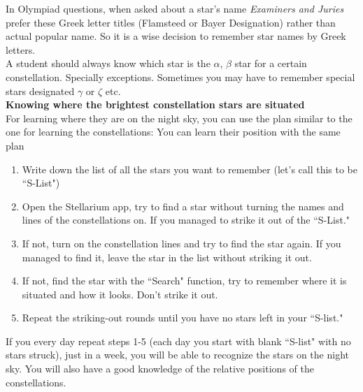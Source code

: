 \documentclass[a4paper,12pt]{extarticle}
\begin{document}
In Olympiad questions, when asked about a star’s name \textit{Examiners and Juries} prefer these Greek letter titles (Flamsteed or Bayer Designation) rather than actual popular name. So it is a wise decision to remember star names by Greek letters.\\

A student should always know which star is the $\alpha$, $\beta$ star for a certain constellation. Specially exceptions. Sometimes you may have to remember special stars designated $\gamma$ or $\zeta$ etc.\\

\textbf{Knowing where the brightest constellation stars are situated}\\

For learning where they are on the night sky, you can use the plan similar to the one for learning the constellations:
You can learn their position with the same plan

\begin{enumerate}[1.]
	\item  Write down the list of all the stars you want to remember (let's call this to be ``S-List")
	\item Open the Stellarium app, try to find a star without turning the names and lines of the constellations on. If you managed to strike it out of the ``S-List."
	\item If not, turn on the constellation lines and try to find the star again. If you managed to find it, leave the star in the list without striking it out.
	\item If not, find the star with the ``Search" function, try to remember where it is situated and how it looks. Don't strike it out.
	\item  Repeat the striking-out rounds until you have no stars left in your ``S-list."
\end{enumerate}

If you every day repeat steps 1-5 (each day you start with blank ``S-list" with no stars struck), just in a week, you will be able to recognize the stars on the night sky. You will also have a good knowledge of the relative positions of the constellations.
\end{document}
